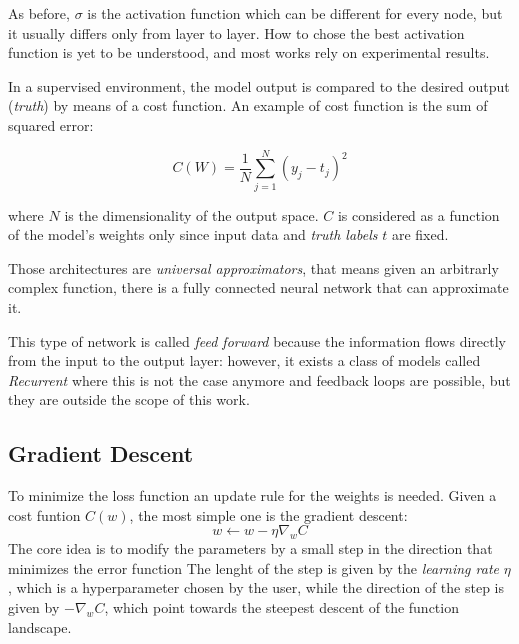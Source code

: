 \documentclass[12pt,a4paper]{report}
\begin{document}
As before, $\sigma$ is the activation function which can be different for every node, but it usually differs only from layer to layer. 
How to chose the best activation function is yet to be understood, and most works rely on experimental results.

In a supervised environment, the model output is compared to the desired output ({\it truth}) by means of a cost function. 
An example of cost function is the sum of squared error: 

\begin{equation}
  C(W) = \frac{1}{N} \sum_{j=1}^{N} (y_j - t_j)^2
\end{equation}

where $N$ is the dimensionality of the output space. $C$ is considered as a function of the model's weights only since input data and {\it truth labels} $t$ are fixed.

Those architectures are {\it universal approximators}, that means given an arbitrarly complex function, there is a fully connected neural network that can approximate it.

This type of network is called {\it feed forward} because the information flows directly from the input to the output layer: however, it exists a class of models called {\it Recurrent} where this is not the case anymore and feedback loops are possible, but they are outside the scope of this work. 

\subsection*{Gradient Descent}

To minimize the loss function an update rule for the weights is needed. 
Given a cost funtion $C(w)$, the most simple one is the gradient descent:
\begin{equation}
 w \leftarrow w - \eta \nabla_w C
\end{equation}
The core idea is to modify the parameters by a small step in the direction that minimizes the error function
The lenght of the step is given by the {\it learning rate} $\eta$, which is a hyperparameter chosen by the user, while the direction of the step is given by $-\nabla_w C$, which point towards the steepest descent of the function landscape.
\end{document}
